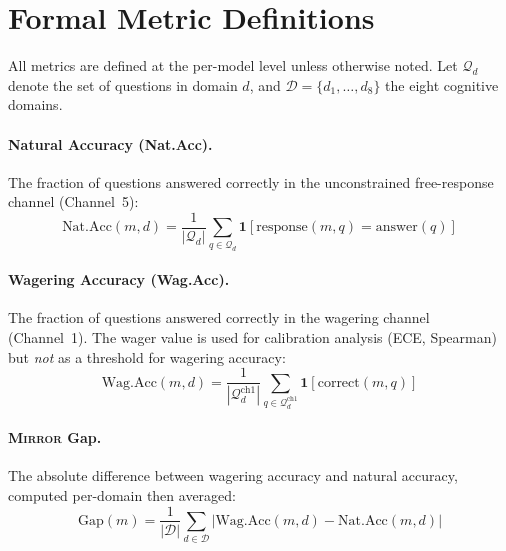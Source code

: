 \documentclass[10pt]{article}
\newcommand{\mirror}{\textsc{Mirror}}
\begin{document}
\section{Formal Metric Definitions}
\label{app:metrics}

All metrics are defined at the per-model level unless otherwise noted. Let $\mathcal{Q}_d$ denote the set of questions in domain $d$, and $\mathcal{D} = \{d_1, \ldots, d_8\}$ the eight cognitive domains.

\paragraph{Natural Accuracy (Nat.Acc).}
The fraction of questions answered correctly in the unconstrained free-response channel (Channel~5):
\begin{equation}
\text{Nat.Acc}(m, d) = \frac{1}{|\mathcal{Q}_d|} \sum_{q \in \mathcal{Q}_d} \mathbf{1}[\text{response}(m, q) = \text{answer}(q)]
\end{equation}

\paragraph{Wagering Accuracy (Wag.Acc).}
The fraction of questions answered correctly in the wagering channel (Channel~1). The wager value is used for calibration analysis (ECE, Spearman) but \textit{not} as a threshold for wagering accuracy:
\begin{equation}
\text{Wag.Acc}(m, d) = \frac{1}{|\mathcal{Q}_d^{\text{ch1}}|} \sum_{q \in \mathcal{Q}_d^{\text{ch1}}} \mathbf{1}[\text{correct}(m, q)]
\end{equation}

\paragraph{\mirror{} Gap.}
The absolute difference between wagering accuracy and natural accuracy, computed per-domain then averaged:
\begin{equation}
\text{Gap}(m) = \frac{1}{|\mathcal{D}|} \sum_{d \in \mathcal{D}} |\text{Wag.Acc}(m, d) - \text{Nat.Acc}(m, d)|
\end{equation}
\end{document}
